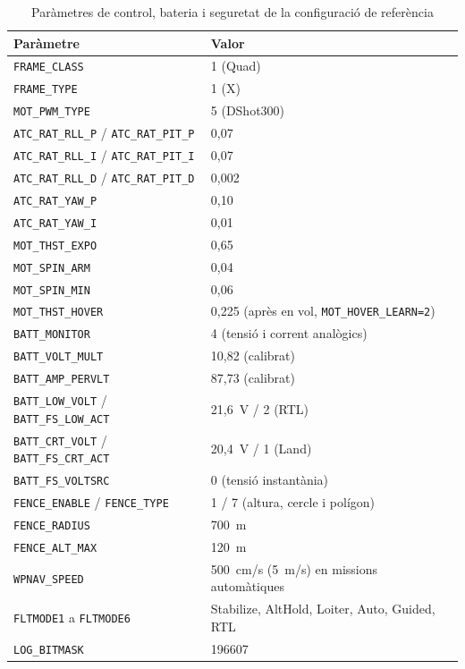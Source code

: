 \begin{table}[H]
    \centering
    \caption{Paràmetres de control, bateria i seguretat de la configuració de referència}
    \label{tab:params-control}
    \small
    \begin{tabular}{ll}
        \toprule
        Paràmetre & Valor \\
        \midrule
        \texttt{FRAME\_CLASS} & 1 (Quad) \\
        \texttt{FRAME\_TYPE} & 1 (X) \\
        \texttt{MOT\_PWM\_TYPE} & 5 (DShot300)~\cite{ardupilot_dshot} \\
        \texttt{ATC\_RAT\_RLL\_P} / \texttt{ATC\_RAT\_PIT\_P} & 0,07 \\
        \texttt{ATC\_RAT\_RLL\_I} / \texttt{ATC\_RAT\_PIT\_I} & 0,07 \\
        \texttt{ATC\_RAT\_RLL\_D} / \texttt{ATC\_RAT\_PIT\_D} & 0,002 \\
        \texttt{ATC\_RAT\_YAW\_P} & 0,10 \\
        \texttt{ATC\_RAT\_YAW\_I} & 0,01 \\
        \texttt{MOT\_THST\_EXPO} & 0,65 \\
        \texttt{MOT\_SPIN\_ARM} & 0,04 \\
        \texttt{MOT\_SPIN\_MIN} & 0,06 \\
        \texttt{MOT\_THST\_HOVER} & 0,225 (après en vol, \texttt{MOT\_HOVER\_LEARN=2}) \\
        \texttt{BATT\_MONITOR} & 4 (tensió i corrent analògics) \\
        \texttt{BATT\_VOLT\_MULT} & 10,82 (calibrat) \\
        \texttt{BATT\_AMP\_PERVLT} & 87,73 (calibrat) \\
        \texttt{BATT\_LOW\_VOLT} / \texttt{BATT\_FS\_LOW\_ACT} & 21,6~V / 2 (RTL) \\
        \texttt{BATT\_CRT\_VOLT} / \texttt{BATT\_FS\_CRT\_ACT} & 20,4~V / 1 (Land) \\
        \texttt{BATT\_FS\_VOLTSRC} & 0 (tensió instantània) \\
        \texttt{FENCE\_ENABLE} / \texttt{FENCE\_TYPE} & 1 / 7 (altura, cercle i polígon) \\
        \texttt{FENCE\_RADIUS} & 700~m \\
        \texttt{FENCE\_ALT\_MAX} & 120~m \\
        \texttt{WPNAV\_SPEED} & 500~cm/s (5~m/s) en missions automàtiques \\
        \texttt{FLTMODE1} a \texttt{FLTMODE6} & Stabilize, AltHold, Loiter, Auto, Guided, RTL \\
        \texttt{LOG\_BITMASK} & 196607 \\
        \bottomrule
    \end{tabular}
\end{table}

